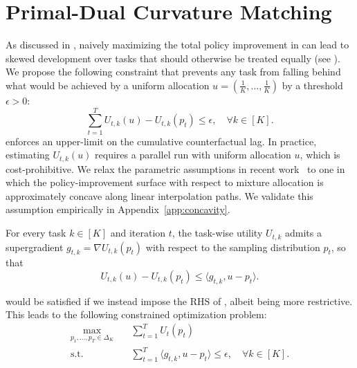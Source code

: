 \section{Primal-Dual Curvature Matching} \label{sec:method}
As discussed in , naively maximizing the total policy improvement in  can lead to skewed development
over tasks that should otherwise be treated equally (see ).  
We propose the following constraint that prevents any task from falling behind
what would be achieved by a uniform allocation $u = (\frac{1}{K},\ldots,\frac{1}{K})$ by a threshold $\epsilon>0$:
\begin{equation} \label{eq:constraint_uniform_baseline}
\sum_{t = 1}^T U_{t, k}\left( u \right) - U_{t, k}(p_t) \leq \epsilon, \quad \forall k\in[K].
\end{equation}
 enforces an upper-limit on the cumulative counterfactual lag. In practice, estimating $U_{t, k}(u)$ requires a parallel run with uniform allocation $u$, which is cost-prohibitive. We relax the parametric assumptions in recent work~\citep{ye2025datamixinglawsoptimizing,chen2025aioli,kang2025autoscalescaleawaredatamixing} to one in which the policy-improvement surface with respect to mixture allocation is approximately concave along linear interpolation paths. We validate this assumption empirically in Appendix~\ref{app:concavity}. 

\begin{assumption}
\label{asm:concavity}
For every task $k\in[K]$ and iteration $t$, the task-wise utility $U_{t,k}$ admits a
supergradient $g_{t,k}=\nabla U_{t,k}(p_t)$ with respect to the sampling distribution
$p_t$, so that
\begin{equation} \label{eq:constraint_upper_bound}
U_{t, k}\left( u \right) - U_{t, k}(p_t) \leq \langle g_{t, k}, u - p_t \rangle .
\end{equation}
\end{assumption}
 would be satisfied if we instead impose the RHS of , albeit being more restrictive. This leads to the following constrained optimization problem:
\begin{equation} \label{eq:constrained_optimization_problem}
\begin{aligned}
\max_{p_1, \dots, p_{T} \in \Delta_K} & \quad \sum_{t=1}^{T} U_t(p_t) \\
\text{s.t.} & \quad \sum_{t = 1}^T \langle g_{t, k}, u - p_t \rangle \leq \epsilon, \quad \forall k\in[K].
\end{aligned}
\end{equation}

